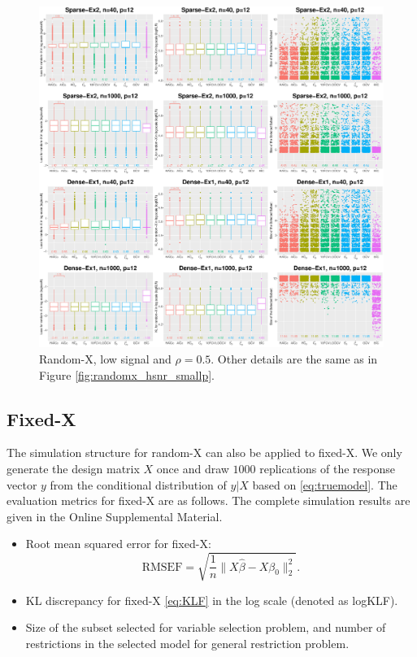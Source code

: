 \begin{figure}[!ht]
  \centering
  \includegraphics[width=\textwidth]{figures/main/randomx/subset_selection/smallp_lsnr.eps}
  \caption{Random-X, low signal and $\rho=0.5$. Other details are the same as in Figure \ref{fig:randomx_hsnr_smallp}.}
  \label{fig:subsetselection_randomx_lsnr_smallp}
\end{figure}
\fi




\subsection{Fixed-X}
The simulation structure for random-X can also be applied to fixed-X. We only generate the design matrix $X$ once and draw $1000$ replications of the response vector $y$ from the conditional distribution of $y|X$ based on \eqref{eq:truemodel}. The evaluation metrics for fixed-X are as follows. The complete simulation results are given in the Online Supplemental Material. 
\begin{itemize}
  \item Root mean squared error for fixed-X:
  \begin{equation*}
    \text{RMSEF} = \sqrt{ \frac{1}{n}\lVert X\hat\beta-X\beta_0 \rVert_2^2 }.
  \end{equation*} 

  \item KL discrepancy for fixed-X \eqref{eq:KLF} in the log scale (denoted as logKLF).

  \item Size of the subset selected for variable selection problem, and number of restrictions in the selected model for general restriction problem.
\end{itemize}

